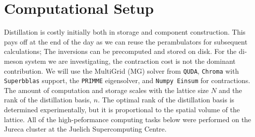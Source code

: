
\chapter{Computational Setup}
\label{sec:comp}

Distillation is costly initially both in storage and component construction. This pays off at the end of the day as we can reuse the perambulators for subsequent calculations; The inversions can be precomputed and stored on disk. For the di-meson system we are investigating, the contraction cost is not the dominant contribution. We will use the MultiGrid (MG) solver from \texttt{QUDA}, \texttt{Chroma} with \texttt{Superbblas} support, the \texttt{PRIMME} eigensolver, and \texttt{Numpy Einsum} for contractions. The amount of computation and storage scales with the lattice size $N$ and the rank of the distillation basis, $n$. The optimal rank of the distillation basis is determined experimentally, but it is proportional to the spatial volume of the lattice. All of the high-peformance computing tasks below were performed on the Jureca cluster at the Juelich Supercomputing Centre. 
